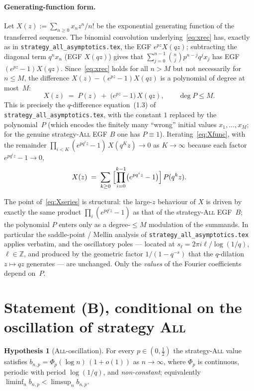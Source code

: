 \documentclass[11pt]{article}
\theoremstyle{definition}
\newtheorem{hypothesis}[theorem]{Hypothesis}
\newcommand{\All}{\textsc{All}}
\newcommand{\Z}{\mathbb{Z}}
\begin{document}
\paragraph{Generating-function form.} Let $X(z):=\sum_{n\ge
0}x_nz^n/n!$ be the exponential generating function of the transferred
sequence. The binomial convolution underlying~\eqref{eq:xrec} has,
exactly as in \texttt{strategy\_all\_asymptotics.tex}, the EGF
$e^{pz}X(qz)$; subtracting the diagonal term $q^nx_n$ (EGF $X(qz)$)
gives that $\sum_{j=0}^{n-1}\binom nj p^{n-j}q^j x_j$ has EGF
$(e^{pz}-1)X(qz)$. Since~\eqref{eq:xrec} holds for all $n>M$ but not
necessarily for $n\le M$, the difference $X(z)-(e^{pz}-1)X(qz)$ is a
polynomial of degree at most~$M$:
\begin{equation}\label{eq:Xfunc}
  X(z) \;=\; P(z) \;+\; \bigl(e^{pz}-1\bigr)\,X(qz),
  \qquad \deg P\le M .
\end{equation}
This is precisely the $q$-difference equation~(1.3) of
\texttt{strategy\_all\_asymptotics.tex}, with the constant $1$ replaced
by the polynomial~$P$ (which encodes the finitely many ``wrong''
initial values $x_1,\dots,x_M$; for the genuine strategy-\All{} EGF
$B$ one has $P\equiv 1$). Iterating~\eqref{eq:Xfunc}, with the
remainder $\prod_{i<K}(e^{pq^iz}-1)\,X(q^Kz)\to 0$ as $K\to\infty$
because each factor $e^{pq^iz}-1\to 0$,
\begin{equation}\label{eq:Xseries}
  X(z) \;=\; \sum_{k\ge 0}\;
  \Bigl[\prod_{i=0}^{k-1}\bigl(e^{p q^i z}-1\bigr)\Bigr]\,P(q^k z).
\end{equation}

The point of~\eqref{eq:Xseries} is structural: the large-$z$ behaviour
of $X$ is driven by exactly the same product
$\prod_i(e^{pq^iz}-1)$ as that of the strategy-\All{} EGF~$B$; the
polynomial $P$ enters only as a degree-$\le M$ modulation of the
summands. In particular the saddle-point / Mellin analysis of
\texttt{strategy\_all\_asymptotics.tex} applies verbatim, and the
oscillatory poles --- located at $s_\ell=2\pi i\ell/\log(1/q)$,
$\ell\in\Z$, and produced by the geometric factor $1/(1-q^{-s})$ that
the $q$-dilation $z\mapsto qz$ generates --- are unchanged. Only the
\emph{values} of the Fourier coefficients depend on~$P$.

\section{Statement (B), conditional on the oscillation of strategy
  \All}\label{sec:status}

\begin{hypothesis}[\All-oscillation]\label{hyp:osc}
  For every $p\in(0,\tfrac12)$ the strategy-\All{} value satisfies
  $b_{n,p}=\Phi_p(\log n)\,(1+o(1))$ as $n\to\infty$, where $\Phi_p$ is
  continuous, periodic with period $\log(1/q)$, and \emph{non-constant};
  equivalently $\liminf_n b_{n,p}<\limsup_n b_{n,p}$.
\end{hypothesis}
\end{document}
